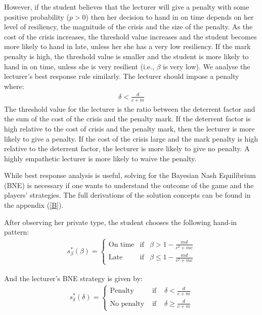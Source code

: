 \documentclass[11pt,preprint, authoryear]{elsarticle}
\numberwithin{equation}{section}
\numberwithin{figure}{section}
\numberwithin{table}{section}
\begin{document}
However, if the student believes that the lecturer will give a penalty
with some positive probability (\(p>0\)) then her decision to hand in on
time depends on her level of resiliency, the magnitude of the crisis and
the size of the penalty. As the cost of the crisis increases, the
threshold value increases and the student becomes more likely to hand in
late, unless her she has a very low resiliency. If the mark penalty is
high, the threshold value is smaller and the student is more likely to
hand in on time, unless she is very resilient (i.e., \(\beta\) is very
low). We analyse the lecturer's best response rule similarly. The
lecturer should impose a penalty where: \begin{align*}
\delta<\frac{d}{c+m}
\end{align*} The threshold value for the lecturer is the ratio between
the deterrent factor and the sum of the cost of the crisis and the
penalty mark. If the deterrent factor is high relative to the cost of
crisis and the penalty mark, then the lecturer is more likely to give a
penalty. If the cost of the crisis large and the mark penalty is high
relative to the deterrent factor, the lecturer is more likely to give no
penalty. A highly empathetic lecturer is more likely to waive the
penalty.

While best response analysis is useful, solving for the Bayesian Nash
Equilibrium (BNE) is necessary if one wants to understand the outcome of
the game and the players' strategies. The full derivations of the
solution concepts can be found in the appendix (\ref{B}).

After observing her private type, the student chooses the following
hand-in pattern:\\
\begin{align*}
s_{\beta}^{*}(\beta)=\left\{\begin{array}{lll}
\text{On time} & \text{if} & \beta>1-\frac{m d}{c^{2}+m c}  \\
\text{Late} & \text{if} & \beta \leq 1-\frac{m d}{c^{2}+m c} 
\end{array}\right.
\end{align*}

And the lecturer's BNE strategy is given by: \begin{align*}
s_{\delta}^{*}(\delta)=\left\{\begin{array}{lll}
\text{Penalty} & \text { if } & \delta<\frac{d}{c+m} \\
\text{No penalty} & \text { if } & \delta \geq \frac{d}{c+m}
\end{array}\right.
\end{align*}
\end{document}
